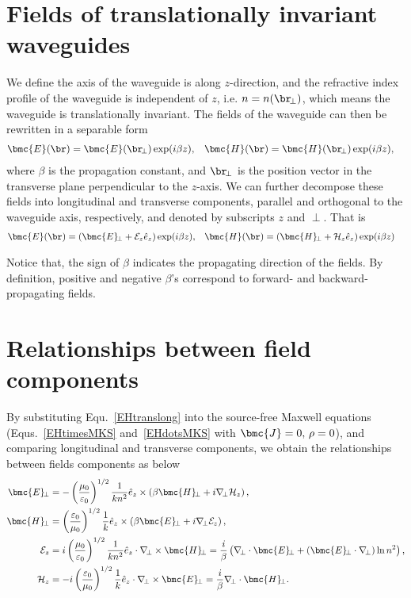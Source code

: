 \section{Fields of translationally invariant waveguides}
We define the axis of the waveguide is along $ z $-direction, and the refractive index profile of the 
waveguide is independent of $ z $, i.e. $ n=n(\br\!_\perp) $, which means the waveguide is 
translationally invariant. The fields of the waveguide can then be rewritten in a separable form
\begin{align}
\bmc{E}(\br) &= \bmc{E}(\br\!_\perp)\exp(i\beta z), & \bmc{H}(\br) &= \bmc{H}(\br\!_\perp)\exp(i\beta 
z),
\end{align}
where $ \beta $ is the propagation constant, and $ \br\!_\perp $ is the position vector in the transverse 
plane perpendicular to the $ z $-axis. We can further decompose these fields into longitudinal and 
transverse components, parallel and orthogonal to the waveguide axis, respectively, and denoted by 
subscripts $ z $ and $ \perp $. That is
\begin{align}\label{EHtranslong}
\bmc{E}(\br) &= \left( \bmc{E}\!_\perp + \mathcal{E}_z \hat{e}_z \right)\exp(i\beta z), & \bmc{H}(\br) &= 
\left( \bmc{H}\!_\perp + \mathcal{H}_z \hat{e}_z\right) \exp(i\beta z)
\end{align}

Notice that, the sign of $ \beta $ indicates the propagating direction of the fields. By definition, positive 
and negative $ \beta $'s correspond to forward- and backward-propagating fields. 

\section{Relationships between field components}\label{MWE:components}
By substituting Equ.~\ref{EHtranslong} into the source-free Maxwell equations 
(Equs.~\ref{EHtimesMKS} and~\ref{EHdotsMKS} with $ \bmc{J}=0,\, \rho=0 $), and comparing 
longitudinal and transverse components, we obtain the relationships between fields components as 
below
\begin{subequations}
\label{EHtz0}
\begin{align}
\bmc{E}\!_\perp &= -\left(\frac{\mu_0}{\varepsilon_0} \right)^{1/2} \frac{1}{kn^2} \hat{e}_z \times 
\left(\beta \bmc{H}\!_\perp + i\nabla\!_\perp \mathcal{H}_z \right),\\
\bmc{H}\!_\perp &= \left(\frac{\varepsilon_0}{\mu_0} \right)^{1/2} \frac{1}{k} \hat{e}_z \times \left(\beta 
\bmc{E}\!_\perp +i\nabla\!_\perp \mathcal{E}_z \right),\\
\mathcal{E}_z &= i\left(\frac{\mu_0}{\varepsilon_0} \right)^{1/2} \frac{1}{kn^2} \hat{e}_z \cdot 
\nabla\!_\perp \times \bmc{H}\!_\perp = \frac{i}{\beta} \left( \nabla\!_\perp \cdot \bmc{E}\!_\perp + 
(\bmc{E}\!_\perp \cdot \nabla\!_\perp) \ln n^2 \right),\\
\mathcal{H}_z &= -i \left(\frac{\varepsilon_0}{\mu_0} \right)^{1/2} \frac{1}{k}\hat{e}_z \cdot 
\nabla\!_\perp \times \bmc{E}\!_\perp = \frac{i}{\beta} \nabla\!_\perp \cdot \bmc{H}\!_\perp. 
\end{align}
\end{subequations}

